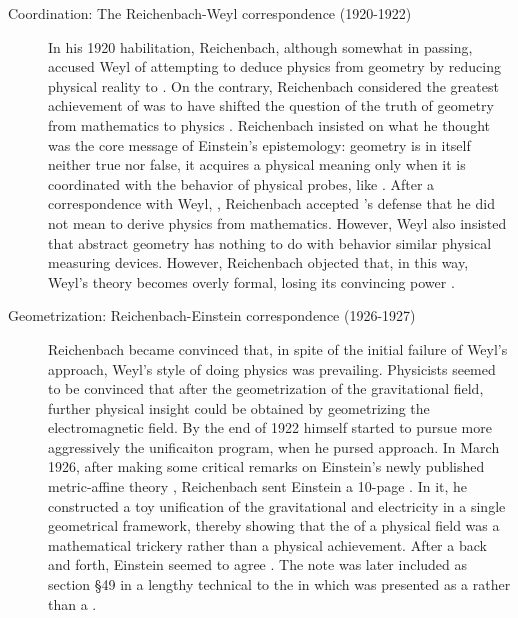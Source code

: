 \documentclass[draft]{article}
\newcommand{\PRZL}{\citetitle{Reichenbach1928}\xspace}
\begin{document}
\begin{description}
\item[Coordination: The Reichenbach-Weyl correspondence (1920-1922)]\label{reichenbachweyl} In his 1920 habilitation, Reichenbach, although somewhat in passing, accused Weyl of attempting to deduce physics from geometry by reducing physical reality to  \citep[73]{Reichenbach1920a}. On the contrary, Reichenbach considered the greatest achievement of \gr was to have shifted the question of the truth of geometry from mathematics to physics \citep[73]{Reichenbach1920a}. Reichenbach insisted on what he thought was the core message of Einstein's epistemology: \spti geometry is in itself neither true nor false, it acquires a physical meaning only when it is coordinated with the behavior of physical probes, like \rac. After a correspondence with Weyl, \citet[367--368]{Reichenbach1921}, Reichenbach accepted 's defense that he did not mean to derive physics from mathematics. However, Weyl also insisted that abstract \spti geometry has nothing to do with behavior similar physical measuring devices. However, Reichenbach objected that, in this way, Weyl's theory becomes overly formal, losing its convincing power \citep[367]{Reichenbach1921}.

\item[Geometrization: Reichenbach-Einstein correspondence (1926-1927)]\label{reichenbacheinsteinI} Reichenbach became convinced that, in spite of the initial failure of Weyl's approach, Weyl's style of doing physics was prevailing. Physicists seemed to be convinced that after the geometrization of the gravitational field, further physical insight could be obtained by geometrizing the electromagnetic field. By the end of 1922  himself started to pursue more aggressively the unificaiton program, when he pursed  approach. In March 1926, after making some critical remarks on Einstein's newly published metric-affine theory \citep{Einstein1925a}, Reichenbach sent Einstein a 10-page  \citep{Reichenbach1926f}. In it, he constructed a toy unification of the gravitational and electricity in a single geometrical framework, thereby showing that the  of a physical field was a mathematical trickery rather than a physical achievement. After a back and forth, Einstein seemed to agree \citep{Lehmkuhl2014}. The note was later included as section \S49 in a lengthy technical \Ap to the \PRZL \citep[-50]{Reichenbach1928} in which \gr was presented as a  rather than a  \citep{Giovanelli2020}. 


\end{description}
\end{document}
